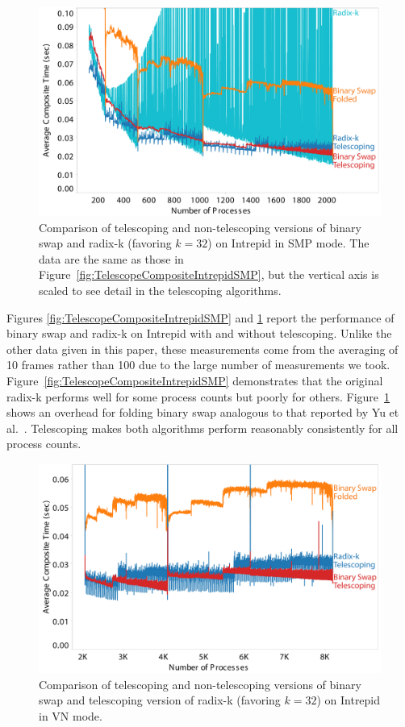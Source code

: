\documentclass{sig-alternate}
\newcommand*{\scite}[1]{~\cite{#1}}
\newcommand{\etal}{et al.}
\begin{document}
\begin{figure}[tbp]
  \centering
  \includegraphics[width=\linewidth]{images/TelescopeCompositeIntrepidSMPZoomed}
  \caption{Comparison of telescoping and non-telescoping versions of binary
    swap and radix-k (favoring $k=32$) on Intrepid in SMP mode.  The data
    are the same as those in
    Figure~\ref{fig:TelescopeCompositeIntrepidSMP}, but the vertical axis
    is scaled to see detail in the telescoping algorithms.}
  \label{fig:TelescopeCompositeIntrepidSMPZoomed}
\end{figure}

Figures \ref{fig:TelescopeCompositeIntrepidSMP} and
\ref{fig:TelescopeCompositeIntrepidSMPZoomed} report the performance of
binary swap and radix-k on Intrepid with and without telescoping.  Unlike
the other data given in this paper, these measurements come from the
averaging of 10 frames rather than 100 due to the large number of
measurements we took.  Figure~\ref{fig:TelescopeCompositeIntrepidSMP}
demonstrates that the original radix-k performs well for some process
counts but poorly for others.
Figure~\ref{fig:TelescopeCompositeIntrepidSMPZoomed} shows an overhead for
folding binary swap analogous to that reported by Yu \etal\scite{23Swap}.
Telescoping makes both algorithms perform reasonably consistently for all
process counts.

\begin{figure}[tbp]
  \centering
  \includegraphics[width=\linewidth]{images/TelescopeCompositeIntrepidVN}
  \caption{Comparison of telescoping and non-telescoping versions of binary
    swap and telescoping version of radix-k (favoring $k=32$) on Intrepid
    in VN mode.}
  \label{fig:TelescopeCompositeIntrepidVN}
\end{figure}
\end{document}
